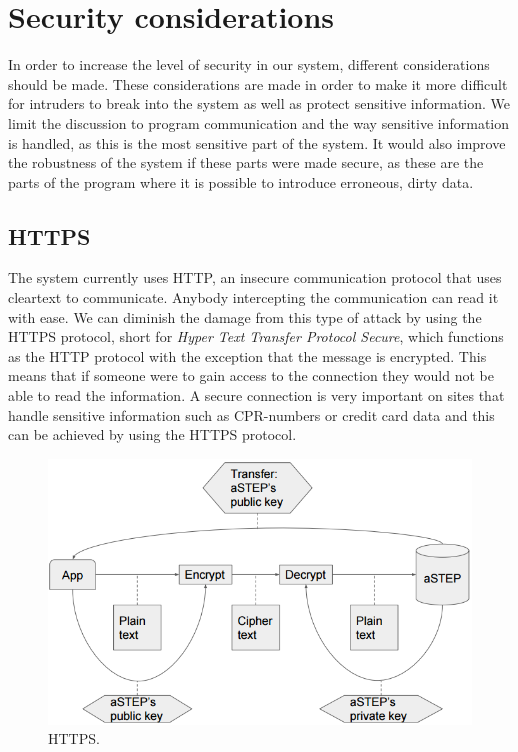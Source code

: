 \section{Security considerations}\label{sec:secure}
In order to increase the level of security in our system, different considerations should be made. These considerations are made in order to make it more difficult for intruders to break into the system as well as protect sensitive information. We limit the discussion to program communication and the way sensitive information is handled, as this is the most sensitive part of the system. It would also improve the robustness of the system if these parts were made secure, as these are the parts of the program where it is possible to introduce erroneous, dirty data.

\subsection*{HTTPS} 
The system currently uses HTTP, an insecure communication protocol that uses cleartext to communicate. Anybody intercepting the communication can read it with ease. We can diminish the damage from this type of attack by using the HTTPS protocol, short for \textit{Hyper Text Transfer Protocol Secure}, which functions as the HTTP protocol with the exception that the message is encrypted. This means that if someone were to gain access to the connection they would not be able to read the information. A secure connection is very important on sites that handle sensitive information such as CPR-numbers or credit card data and this can be achieved by using the HTTPS protocol\cite{HTTPS}.

\begin{figure}[ht]
	\begin{center}
		\includegraphics[scale=0.9]{graphics/encrypt_decrypt.png}
		\caption{HTTPS.}
		\label{fig:HTTPS}
	\end{center} 
\end{figure}

